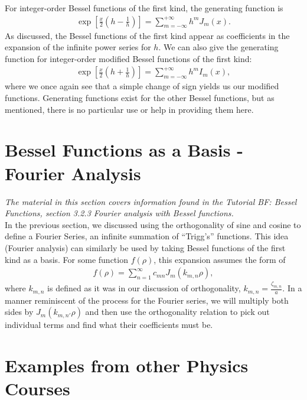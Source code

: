 \documentclass[11pt]{report}
\begin{document}
For integer-order Bessel functions of the first kind, the generating function is
    \begin{align}
        \exp{\left[\frac{x}{2}\left(h-\frac{1}{h}\right)\right]} = \sum_{m=-\infty}^{+\infty}h^mJ_m(x).
    \end{align}
As discussed, the Bessel functions of the first kind appear as coefficients in the expansion of the infinite power series for $h$. We can also give the generating function for integer-order modified Bessel functions of the first kind:
    \begin{align}
        \exp{\left[\frac{x}{2}\left(h+\frac{1}{h}\right)\right]} = \sum_{m=-\infty}^{+\infty}h^mI_m(x),
    \end{align}
where we once again see that a simple change of sign yields us our modified functions. Generating functions exist for the other Bessel functions, but as mentioned, there is no particular use or help in providing them here.

\section{Bessel Functions as a Basis - Fourier Analysis}

\emph{The material in this section covers information found in the Tutorial BF: Bessel Functions, section 3.2.3 Fourier analysis with Bessel functions.}\\


In the previous section, we discussed using the orthogonality of sine and cosine to define a Fourier Series, an infinite summation of ``Trigg's'' functions. This idea (Fourier analysis) can similarly be used by taking Bessel functions of the first kind as a basis. For some function $f(\rho)$, this expansion assumes the form of
    \begin{align}
        f(\rho) = \sum_{n=1}^\infty c_{mn}J_m(k_{m,n}\rho),
    \end{align}
where $k_{m,n}$ is defined as it was in our discussion of orthogonality, $k_{m,n} = \frac{\zeta_{m,n}}{a}$. In a manner reminiscent of the process for the Fourier series, we will multiply both sides by $J_m(k_{m,n'}\rho)$ and then use the orthogonality relation to pick out individual terms and find what their coefficients must be.

\section{Examples from other Physics Courses}
\end{document}
